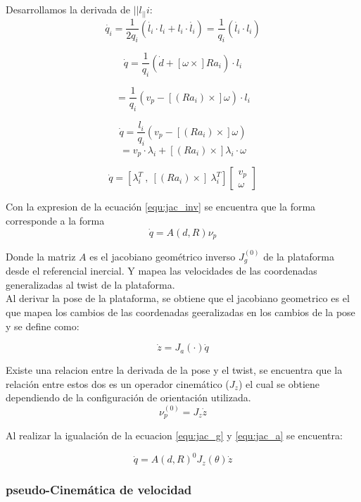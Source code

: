 \documentclass[letterpaper, 12pt]{article}
\begin{document}
Desarrollamos la derivada de $||l_||i$:
\begin{equation}
\dot{q_i} = \frac{1}{2q_i} (\dot{l_i} \cdot l_i + l_i \cdot \dot{l_i}) = \frac{1}{q_i} (\dot{l_i} \cdot l_i)
\end{equation}

\begin{equation}
\dot{q}=\frac{1}{q_i}(\dot{d} + [\omega \times] Ra_i)\cdot l_i 
\end{equation}

\begin{equation*}
= \frac{1}{q_i}(v_p - [(Ra_i)\times]\omega)\cdot l_i
\end{equation*}

\begin{equation}
\dot{q} = \frac{l_i}{q_i}\left( v_p - [(Ra_i)\times]\omega \right) 
\end{equation}
\begin{equation*}
= v_p \cdot \lambda_i + [(Ra_i)\times]\lambda_i \cdot \omega
\end{equation*}

\begin{equation} \label{equ:jac_inv}
\dot{q} = [\lambda_i^T\ ,\ [(Ra_i)\times]\ \lambda_i^T] \begin{bmatrix}
v_p\\
\omega
\end{bmatrix}
\end{equation}

Con la expresion de la ecuación \ref{equ:jac_inv} se encuentra que la forma corresponde a la forma
\begin{equation} \label{equ:jac_g}
\dot{q} = A(d,R) \nu_p
\end{equation}

Donde la matriz $A$ es el jacobiano geométrico inverso $J_g^{(0)}$ de la plataforma desde el referencial inercial. Y mapea las velocidades de las coordenadas generalizadas al twist de la plataforma.\\

Al derivar la pose de la plataforma, se obtiene que el jacobiano geometrico es el que mapea los cambios de las coordenadas geeralizadas en los cambios de la pose y se define como:

\begin{equation} \label{equ:jac_a}
\dot{z} = J_a(\cdot)\dot{q}
\end{equation}

Existe una relacion entre la derivada de la pose y el twist, se encuentra que la relación entre estos dos es un operador cinemático ($J_z$) el cual se obtiene dependiendo de la configuración de orientación utilizada.\\
\begin{equation}
\nu_p^{(0)} = J_z\dot{z}
\end{equation}

Al realizar la igualación de la ecuacion \ref{equ:jac_g} y \ref{equ:jac_a} se encuentra:

\begin{equation}
\dot{q} = A(d,R)^0J_z(\theta) \dot{z}
\end{equation}

\subsubsection{pseudo-Cinemática de velocidad}
\end{document}
